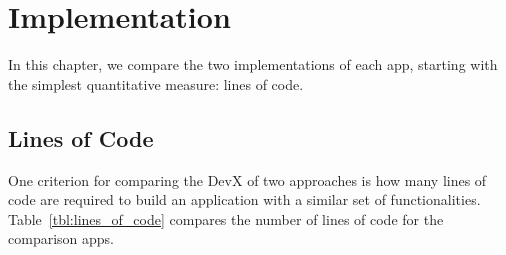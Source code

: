 
\chapter{Implementation}
\label{chap:lines_of_code}


In this chapter, we compare the two implementations of each app,
starting with the simplest quantitative measure:  lines of code.

\section{Lines of Code}

One criterion for comparing the DevX of two approaches is how many lines of code are required to build an application with a similar set of functionalities.
Table~\ref{tbl:lines_of_code} compares the number of lines of code for the comparison apps.

\setlength{\extrarowheight}{5pt} %
\setlength{\tabcolsep}{10pt} %

